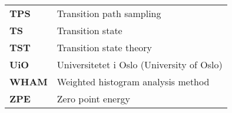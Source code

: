 \begin{longtable}{p{} p{}}
\textbf{TPS} & Transition path sampling  \\
\textbf{TS}  & Transition state \\
\textbf{TST} & Transition state theory  \\
\textbf{UiO} & Universitetet i Oslo (University of Oslo) \\ 
\textbf{WHAM} & Weighted histogram analysis method \\
\textbf{ZPE} & Zero point energy\\
\end{longtable}